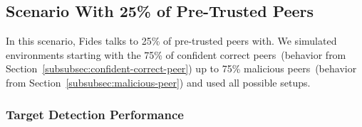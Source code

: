 \cleartoleftpage
\subsection{Scenario With 25\% of Pre-Trusted Peers}
\label{subsec:scenario-with-25-pretrusted-peers}

In this scenario, Fides talks to 25\% of pre-trusted peers with. We simulated environments starting with the 75\% of confident correct peers~(behavior from Section~\ref{subsubsec:confident-correct-peer}) up to 75\% malicious peers~(behavior from Section~\ref{subsubsec:malicious-peer}) and used all possible setups.

\subsubsection{Target Detection Performance}

